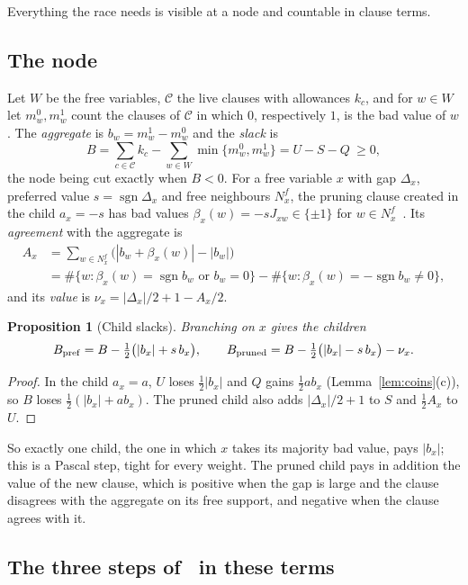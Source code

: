 \documentclass[11pt,a4paper]{article}
\newtheorem{proposition}[theorem]{Proposition}
\theoremstyle{definition}
\theoremstyle{remark}
\newcommand{\sgn}{\operatorname{sgn}}
\begin{document}
Everything the race needs is visible at a node and countable in clause terms.

\subsection{The node}

Let $W$ be the free variables, $\mathcal C$ the live clauses with allowances
$k_c$, and for $w\in W$ let $m^0_w,m^1_w$ count the clauses of $\mathcal C$ in
which $0$, respectively $1$, is the bad value of $w$. The \emph{aggregate} is
$b_w=m^1_w-m^0_w$ and the \emph{slack} is
\[
 B=\sum_{c\in\mathcal C}k_c-\sum_{w\in W}\min\{m^0_w,m^1_w\}=U-S-Q\ \ge0 ,
\]
the node being cut exactly when $B<0$. For a free variable $x$ with gap
$\Delta_x$, preferred value $s=\sgn\Delta_x$ and free neighbours $N^f_x$, the
pruning clause created in the child $a_x=-s$ has bad values
$\beta_x(w)=-sJ_{xw}\in\{\pm1\}$ for $w\in N^f_x$~\cite[Lemma~4(b)]{N9}. Its
\emph{agreement} with the aggregate is
\begin{align*}
 A_x&=\sum_{w\in N^f_x}\bigl(|b_w+\beta_x(w)|-|b_w|\bigr)\\
 &=\#\{w:\beta_x(w)=\sgn b_w\text{ or }b_w=0\}-\#\{w:\beta_x(w)=-\sgn b_w\ne0\},
\end{align*}
and its \emph{value} is $\nu_x=|\Delta_x|/2+1-A_x/2$.

\begin{proposition}[Child slacks]\label{prop:children}
Branching on $x$ gives the children
\[
 B_{\rm pref}=B-\tfrac12\bigl(|b_x|+s\,b_x\bigr),\qquad
 B_{\rm pruned}=B-\tfrac12\bigl(|b_x|-s\,b_x\bigr)-\nu_x .
\]
\end{proposition}

\begin{proof}
In the child $a_x=a$, $U$ loses $\frac12|b_x|$ and $Q$ gains $\frac12ab_x$
(Lemma~\ref{lem:coins}(c)), so $B$ loses $\frac12(|b_x|+ab_x)$. The pruned
child also adds $|\Delta_x|/2+1$ to $S$ and $\frac12A_x$ to $U$.
\end{proof}

So exactly one child, the one in which $x$ takes its majority bad value, pays
$|b_x|$; this is a Pascal step, tight for every weight. The pruned child pays
in addition the value of the new clause, which is positive when the gap is
large and the clause disagrees with the aggregate on its free support, and
negative when the clause agrees with it.

\subsection{The three steps of~\cite{N4} in these terms}
\end{document}
